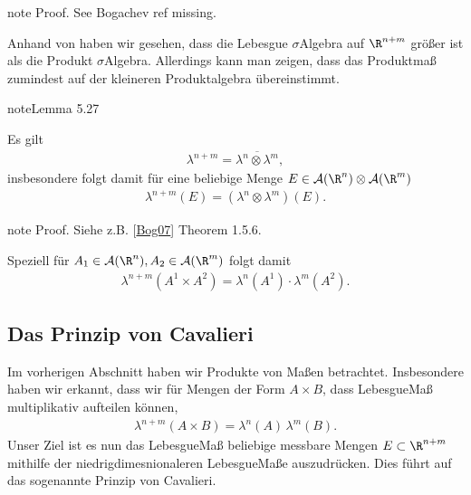 \documentclass[letterpaper,10pt,german]{jupyterBook}
\begin{document}
\begin{sphinxadmonition}{note}
\sphinxAtStartPar
Proof. See Bogachev ref missing.
\end{sphinxadmonition}

\sphinxAtStartPar
Anhand von {\hyperref[\detokenize{masstheorie/integrationstechnik:ex:prodsig}]{}} haben wir gesehen, dass die Lebesgue \(\sigma\)\sphinxhyphen{}Algebra auf \(\R^{n+m}\) größer ist als die Produkt \(\sigma\)\sphinxhyphen{}Algebra. Allerdings kann man zeigen, dass das Produktmaß zumindest auf der kleineren Produktalgebra übereinstimmt.
\label{masstheorie/integrationstechnik:lem:lebesguecomp}
\begin{sphinxadmonition}{note}{Lemma 5.27}



\sphinxAtStartPar
Es gilt
\begin{equation*}
\begin{split}\lambda^{n+m} = \overline{\lambda^n\otimes\lambda^m},\end{split}
\end{equation*}
\sphinxAtStartPar
insbesondere folgt damit für eine beliebige Menge \(E\in \mathcal{A}(\R^n)\otimes\mathcal{A}(\R^m)\)
\begin{equation*}
\begin{split}\lambda^{n+m}(E) = (\lambda^n\otimes\lambda^m)(E).\end{split}
\end{equation*}\end{sphinxadmonition}

\begin{sphinxadmonition}{note}
\sphinxAtStartPar
Proof. Siehe z.B. {[}\hyperlink{cite.references:id5}{Bog07}{]} Theorem 1.5.6.
\end{sphinxadmonition}

\sphinxAtStartPar
Speziell für \(A_1\in\mathcal{A}(\R^n), A_2\in\mathcal{A}(\R^m)\) folgt damit
\begin{equation*}
\begin{split}\lambda^{n+m}(A^1\times A^2)=\lambda^{n}(A^1)\cdot\lambda^{m}(A^2).\end{split}
\end{equation*}

\subsection{Das Prinzip von Cavalieri}
\label{\detokenize{masstheorie/integrationstechnik:das-prinzip-von-cavalieri}}
\sphinxAtStartPar
Im vorherigen Abschnitt haben wir Produkte von Maßen betrachtet. Insbesondere haben wir erkannt, dass wir für Mengen der Form \(A\times B\), dass Lebesgue\sphinxhyphen{}Maß multiplikativ aufteilen können,
\begin{equation*}
\begin{split}\lambda^{n+m}(A\times B) = \lambda^n(A)\,\lambda^m(B).\end{split}
\end{equation*}
\sphinxAtStartPar
Unser Ziel ist es nun das Lebesgue\sphinxhyphen{}Maß beliebige messbare Mengen \(E\subset\R^{n+m}\) mithilfe der niedrigdimesnionaleren Lebesgue\sphinxhyphen{}Maße auszudrücken. Dies führt auf das sogenannte Prinzip von Cavalieri.
\end{document}
